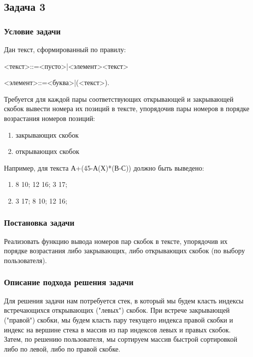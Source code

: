 \documentclass[a4paper, 14pt]{extarticle}
\begin{document}
\subsection{Задача 3}
\subsubsection{Условие задачи}
Дан текст, сформированный по правилу:

<текст>::=<пусто>|<элемент><текст>

<элемент>::=<буква>|(<текст>).

Требуется для каждой пары соответствующих открывающей и
закрывающей скобок вывести номера их позиций в тексте, упорядочив
пары номеров в порядке возрастания номеров позиций:
\begin{enumerate}
  \item закрывающих скобок
  \item открывающих скобок
  \end{enumerate}
Например, для текста А+(45-А(Х)*(В-С)) должно быть выведено:
\begin{enumerate}
  \item 8 10; 12 16; 3 17;
  \item 3 17; 8 10; 12 16;
\end{enumerate}
\subsubsection{Постановка задачи}
Реализовать функцию вывода номеров пар скобок в тексте, упорядочив их порядке
возрастания либо закрывающих, либо открывающих скобок (по выбору пользователя).
\subsubsection{Описание подхода решения задачи}
Для решения задачи нам потребуется стек, в который мы будем класть индексы
встречающихся открывающих ("левых") скобок. При встрече закрывающей ("правой") скобки, мы будем
класть пару текущего индекса правой скобки и индекс на вершине стека в массив из
пар индексов левых и правых скобок. Затем, по решению пользователя, мы сортируем
массив быстрой сортировкой либо по левой, либо по правой скобке.
\end{document}
